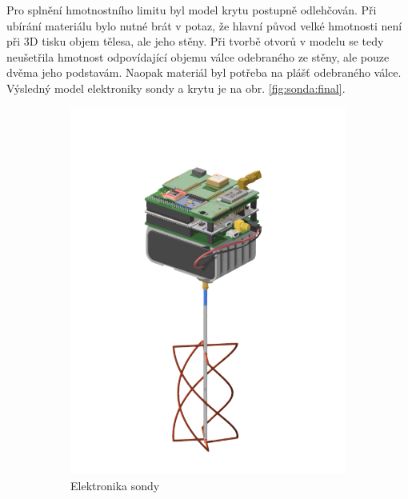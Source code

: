 \documentclass[twoside]{ctuthesis}
\theoremstyle{plain}
\theoremstyle{definition}
\theoremstyle{note}
\begin{document}
	Pro splnění hmotnostního limitu byl model krytu postupně odlehčován. Při ubírání materiálu bylo nutné brát v potaz, že hlavní původ velké hmotnosti není při 3D tisku objem tělesa, ale jeho stěny. Při tvorbě otvorů v modelu se tedy neušetřila hmotnost odpovídající objemu válce odebraného ze stěny, ale pouze dvěma jeho podstavám. Naopak materiál byl potřeba na plášť odebraného válce. Výsledný model elektroniky sondy a krytu je na obr. \ref{fig:sonda:final}.
	\begin{figure}[hbtp]
		\centering
		\begin{subfigure}{.49\textwidth}
			\centering
			\includegraphics[width = .85\textwidth]{Figures/sonda_no_case.png}
			\caption{Elektronika sondy}
			\label{fig:sonda:no:case}
		\end{subfigure}
		\begin{subfigure}{.49\textwidth}
			\centering

\end{subfigure}
\end{figure}
\end{document}
